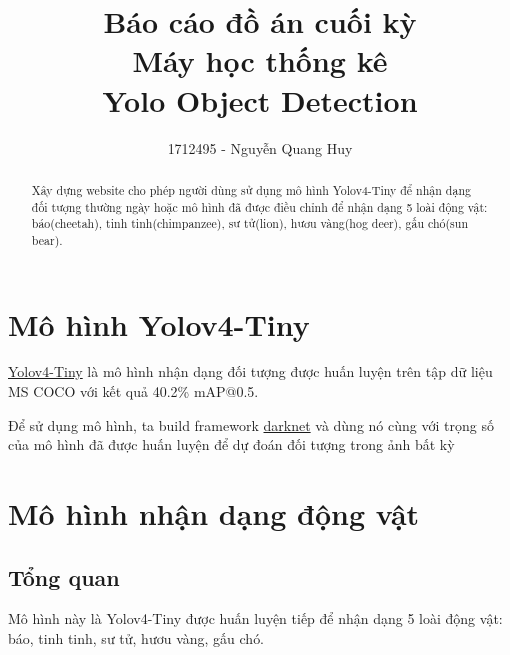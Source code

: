 \documentclass[20pt, a4paper]{article}
\begin{document}
\title{Báo cáo đồ án cuối kỳ \\
Máy học thống kê\\
Yolo Object Detection}
\author{1712495 - Nguyễn Quang Huy}
\maketitle

\renewcommand{\abstractname}{Tóm tắt}
\begin{abstract}
	Xây dựng website cho phép người dùng sử dụng mô hình Yolov4-Tiny để nhận dạng đối tượng thường ngày 
	hoặc mô hình đã được điều chỉnh để nhận dạng 5 loài động vật: báo(cheetah), tinh tinh(chimpanzee), sư tử(lion), hươu vàng(hog deer), gấu chó(sun bear). 
\end{abstract}

\renewcommand{\contentsname}{Mục lục}
\tableofcontents

\section{Mô hình Yolov4-Tiny}

\href{https://github.com/AlexeyAB/darknet#pre-trained-models}{Yolov4-Tiny} 
là mô hình nhận dạng đối tượng được huấn luyện trên tập dữ liệu MS COCO với kết quả 40.2\% mAP@0.5.

Để sử dụng mô hình, ta build framework \href{https://github.com/AlexeyAB/darknet}{darknet} và dùng nó cùng với trọng số của mô hình đã được huấn luyện để dự đoán đối tượng trong ảnh bất kỳ

\section{Mô hình nhận dạng động vật}
\subsection{Tổng quan}
Mô hình này là Yolov4-Tiny được huấn luyện tiếp để nhận dạng 5 loài động vật: báo, tinh tinh, sư tử, hươu vàng, gấu chó.
\end{document}
